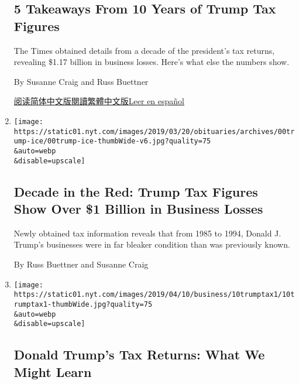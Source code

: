 \begin{enumerate}
{  \subsection{5 Takeaways From 10 Years of Trump Tax
  Figures}\label{5-takeaways-from-10-years-of-trump-tax-figures}}

  The Times obtained details from a decade of the president's tax
  returns, revealing \$1.17 billion in business losses. Here's what else
  the numbers show.

  By Susanne Craig and Russ Buettner

  \href{https://cn.nytimes.com/usa/20190508/trump-tax-figures/}{阅读简体中文版}\href{https://cn.nytimes.com/usa/20190508/trump-tax-figures/zh-hant/}{閱讀繁體中文版}\href{https://www.nytimes.com/es/2019/05/08/trump-declaraciones-impuestos/}{Leer
  en español}
\item
  \href{/interactive/2019/05/07/us/politics/donald-trump-taxes.html}{}

  \texttt{[image: https://static01.nyt.com/images/2019/03/20/obituaries/archives/00trump-ice/00trump-ice-thumbWide-v6.jpg?quality=75\\\&auto=webp\\\&disable=upscale]}

  \hypertarget{decade-in-the-red-trump-tax-figures-show-over-1-billion-in-business-losses}{%
  \subsection{Decade in the Red: Trump Tax Figures Show Over \$1 Billion
  in Business
  Losses}\label{decade-in-the-red-trump-tax-figures-show-over-1-billion-in-business-losses}}

  Newly obtained tax information reveals that from 1985 to 1994, Donald
  J. Trump's businesses were in far bleaker condition than was
  previously known.

  By Russ Buettner and Susanne Craig
\item
  \href{/2019/04/10/business/trump-tax-returns.html}{}

  \texttt{[image: https://static01.nyt.com/images/2019/04/10/business/10trumptax1/10trumptax1-thumbWide.jpg?quality=75\\\&auto=webp\\\&disable=upscale]}

  \hypertarget{donald-trumps-tax-returns-what-we-might-learn}{%
  \subsection{Donald Trump's Tax Returns: What We Might
  Learn}\label{donald-trumps-tax-returns-what-we-might-learn}}


\end{enumerate}
